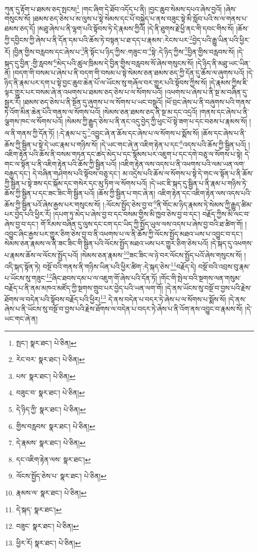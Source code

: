 ཀུན་དུ་རྟོག་པ་ཐམས་ཅད་སྤངས།\footnote{སྤང་།  སྣར་ཐང་།  པེ་ཅིན། } །གང་ཞིག་དེ་ཐོབ་འདོད་པ་ནི། །བྱང་ཆུབ་སེམས་དཔའ་ཞེས་བྱའོ། །ཞེས་གསུངས་སོ། །ཐམས་ཅད་ཅེས་པ་མ་ལུས་པ་སྟེ་སེམས་དང་པོ་བསྐྱེད་པ་ནས་བཟུང་སྟེ་མི་སློབ་པའི་ས་ལ་གནས་པ་ཐམས་ཅད་དོ། །མཐུ་ཞེས་པ་ནི་ལྷག་པའི་སྟོབས་ཏེ་དེ་རྣམས་ཀྱིའོ། །དེ་ནི་ཐུགས་རྗེ་ཕྱི་ནང་གི་དབང་གིས་སོ། །ཆོས་ཀྱི་དབྱིངས་ཀྱི་ཞེས་པ་ནི་དོན་དམ་པའི་ཆོས་ཏེ་བསྟན་པ་ཐ་དད་པ་རྣམས་:རེངས་པར་\footnote{རེང་བར་  སྣར་ཐང་།  པེ་ཅིན། }བྱེད་པའི་རྒྱུ་ཡིན་པའི་ཕྱིར་རོ། །བྱིན་གྱིས་བརླབས་དང་ཞེས་པ་\footnote{པས་  སྣར་ཐང་།  པེ་ཅིན། }ནི་སྟོང་པ་ཉིད་ཀྱིས་:གཟུང་བ་\footnote{བཟུང་བ་  སྣར་ཐང་།  པེ་ཅིན། }སྟེ་:དེ་ཉིད་ཀྱིས་\footnote{དེ་ཉིད་ཀྱི་  སྣར་ཐང་།  པེ་ཅིན། }བྱིན་གྱིས་བརླབས་སོ། །དེ་སྐད་དུ་བྱིན་:གྱི་རླབས་\footnote{གྱིས་བརླབས་  སྣར་ཐང་།  པེ་ཅིན། }མེད་པའི་ཚུལ་ཁྲིམས་དེ་བྱིན་གྱིས་བརླབས་སོ་ཞེས་གསུངས་སོ། །དེ་ཉིད་ནི་མཐུ་ཡང་ཡིན་ནོ། །བདག་གི་བསམ་པ་ཞེས་པ་ནི་བདག་གི་བསམ་པ་སྟེ་སེམས་ཅན་ཐམས་ཅད་ཀྱི་དོན་དུ་ཆོས་ལ་ཞུགས་པའོ། །དེ་ཉིད་ནི་རྣམ་པར་དག་པ་སྟེ་བྱང་ཆུབ་ཆེན་པོ་ལ་ཡོངས་སུ་གཞོལ་བར་གྱུར་པའི་སྟོབས་ཀྱིས་སོ། །དེ་རྣམས་ཀྱིས་ཇི་ལྟར་གྱུར་པར་བསམ་ཞེ་ན་འཕགས་པ་ཐམས་ཅད་ཅེས་པ་ལ་སོགས་པའོ། །འཕགས་པ་ཞེས་པ་ནི་སྔ་མ་བཞིན་དུ་སྦྱར་རོ། །ཐམས་ཅད་ཅེས་པ་ནི་སྔོན་དུ་ཞུགས་པ་ལ་སོགས་པ་ཡང་བསྡུའོ། །ཕོ་བྲང་ཞེས་པ་ནི་བཞུགས་པའི་གནས་ཏེ་འོག་མིན་ཆེན་པོའི་གནས་ལ་སོགས་པའོ། །སེམས་ཅན་ཐམས་ཅད་ནི་སྔ་མ་དང་འདྲའོ། །གནས་དང་ཞེས་པ་ནི་ལྕགས་ཁང་ལ་སོགས་པའོ། །སེམས་ཀྱི་རྒྱུད་ཅེས་པ་ནི་ནང་འདུ་བྱེད་ཀྱི་ཕུང་པོ་སྟེ་ཟག་པ་དང་བཅས་པ་རྣམས་སོ། །ལ་ནི་གནས་ཀྱི་དོན་ཏོ། །:དེ་རྣམ་པ་དུ་\footnote{དེ་རྣམས་  སྣར་ཐང་།  པེ་ཅིན། }འབྱུང་ཞེ་ན་ཆོས་དང་ཞེས་པ་ལ་སོགས་པ་སྨོས་སོ། །ཆོས་དང་ཞེས་པ་ནི་ཆོས་ཀྱི་སྦྱིན་པ་སྟེ་དེ་ཡང་རྣམ་པ་གཉིས་སོ། །དེ་ཡང་གང་ཞེ་ན་འཇིག་རྟེན་པ་དང་\footnote{དང་འཇིག་རྟེན་ལས་  སྣར་ཐང་། }འདས་པའི་ཆོས་ཀྱི་སྦྱིན་པའོ། །འཇིག་རྟེན་པའི་ཆོས་ནི་བསམ་གཏན་དང་ཚད་མེད་པ་དང་སྙོམས་པར་འཇུག་པ་དང་དགེ་བཅུ་ལ་སོགས་པ་སྟེ། དེ་གང་ལ་སྟོན་པ་ནི་འཇིག་རྟེན་པའི་ཆོས་ཀྱི་སྦྱིན་པའོ། །འཇིག་རྟེན་ལས་འདས་པ་ནི་འཕགས་པའི་ལམ་ཡན་ལག་བརྒྱད་དང་། དེ་བཞིན་གཤེགས་པའི་སྟོབས་བཅུ་དང་། མ་འདྲེས་པའི་ཆོས་ལ་སོགས་པ་སྟེ་དེ་གང་ལ་སྟོན་པ་ནི་ཆོས་ཀྱི་སྦྱིན་པ་སྟེ་ཟས་དང་སྐོམ་དང་གསེར་དང་མུ་ཏིག་ལ་སོགས་པའོ། །དེ་ཡང་ཇི་སྐད་དུ་སྦྱིན་པ་ནི་རྣམ་པ་གཉིས་ཏེ་ཆོས་ཀྱི་སྦྱིན་པ་དང་ཟང་ཟིང་གི་སྦྱིན་པའོ། །ཆོས་ཀྱི་སྦྱིན་པ་གང་ཞེ་ན། འཇིག་རྟེན་དང་འཇིག་རྟེན་ལས་འདས་པའི་ཆོས་ཀྱི་སྦྱིན་པའོ་ཞེས་རྒྱས་པར་གསུངས་སོ། །:ལོངས་སྤྱོད་ཅེས་བྱ་བ་\footnote{ལོངས་སྤྱོད་ཅེས་པ་  སྣར་ཐང་།  པེ་ཅིན། }ནི་གོང་མ་ཉིད་རྣམས་ཏེ་སེམས་ཀྱི་རྒྱུད་ཚིམ་པར་བྱེད་པའི་ཕྱིར་རོ། །དཔག་ཏུ་མེད་པ་ཞེས་བྱ་བ་དང་བསམ་གྱིས་མི་ཁྱབ་ཅེས་བྱ་བ་དང་། བརྗོད་ཀྱིས་མི་ལང་བ་ཞེས་བྱ་བ་དང་། གོ་རིམས་བཞིན་དུ་ལུས་དང་ངག་དང་ཡིད་ཀྱི་སྤྱོད་ཡུལ་ལས་འདས་པ་ཞེས་བྱ་བའི་ཐ་ཚིག་གོ། །འབྱུང་ཞིང་རྒྱས་པར་གྱུར་ཅིག་ཅེས་བྱ་བ་ནི་འཕགས་པ་ལ་ནི་ཆོས་ཀྱི་ལོངས་སྤྱོད་མཐའ་ཡས་པ་འབྱུང་བ་དང་། སེམས་ཅན་རྣམས་ལ་ནི་ཟང་ཟིང་གི་སྦྱིན་པའི་ལོངས་སྤྱོད་མཐའ་ཡས་པར་གྱུར་ཅིག་ཅེས་པའོ། །དེ་སྐད་དུ་འཕགས་པ་རྣམས་ཆོས་ལ་ལོངས་སྤྱོད་པའོ། །སེམས་ཅན་རྣམས་\footnote{རྣམས་ལ་  སྣར་ཐང་།  པེ་ཅིན། }ཟང་ཟིང་ལ་ཉེ་བར་ལོངས་སྤྱོད་པའོ་ཞེས་གསུངས་སོ། །འདི་སྐད་སྟོན་ཏེ། བསྔོ་བའི་གནས་ནི་གཉིས་ཡིན་པའི་ཕྱིར་ཚིག་:དེ་སྐད་ཅེས་\footnote{དེ་སྐད་  སྣར་ཐང་། }བརྗོད་དེ། བསྔོ་བའི་འབྲས་བུ་རྣམ་པ་ཡོངས་སུ་གཟུང་\footnote{བཟུང་  སྣར་ཐང་།  པེ་ཅིན། }ཞིང་ཐབས་དམ་པ་ལ་འཇུག་གོ་ཞེས་པའི་དོན་ཏོ། །གོང་གི་སྤེལ་བའི་སྔགས་ལན་གསུམ་བརྗོད་པ་ནི་ནམ་མཁའ་མཛོད་ཀྱི་སྔགས་གྲུབ་པར་བྱེད་པའི་ཡན་ལག་གོ། །དེ་ནས་ཡོངས་སུ་བསྔོ་བ་བྱས་པའི་རྗེས་ཐོགས་ལ་བདེན་པའི་སྟོབས་བརྗོད་པའི་ཕྱིར།\footnote{ཕྱིར་རོ།  སྣར་ཐང་།  པེ་ཅིན། } དེ་ནས་བདེན་པ་བདར་ཏེ་ཞེས་པ་ལ་སོགས་པ་སྨོས་སོ། །དེ་ནས་ཞེས་པ་ནི་ཡོངས་སུ་བསྔོ་བ་བྱས་པའི་རྗེས་ཐོགས་ལ་བདེན་པ་བདར་ཏེ་ཞེས་པ་ནི་འོག་ནས་འབྱུང་བ་རྣམས་སོ། །དེ་ཡང་གང་ཞེ་ན། 